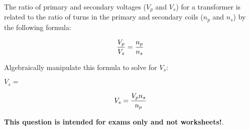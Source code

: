 

The ratio of primary and secondary voltages ($V_p$ and $V_s$) for a transformer is related to the ratio of turns in the primary and secondary coils ($n_p$ and $n_s$) by the following formula:

$${V_p \over V_s} = {n_p \over n_s}$$

Algebraically manipulate this formula to solve for $V_s$:

\vskip 20pt

$V_s = $

\vskip 10pt







$$V_s = {{V_p n_s} \over n_p}$$







{\bf This question is intended for exams only and not worksheets!}.



